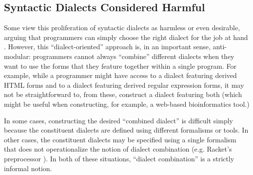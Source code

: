 \subsection{Syntactic Dialects Considered Harmful}
Some  view this proliferation of syntactic dialects as harmless or even desirable, arguing that programmers can simply choose the right dialect for the job at hand \cite{journals/stp/Ward94}. However, this ``dialect-oriented'' approach is, in an important sense, anti-modular: programmers cannot always ``combine'' different dialects when they want to use the forms that they feature together within a single program. For example, while a programmer might have access to a dialect featuring derived HTML forms and to a dialect featuring derived regular expression forms, it may not be straightforward to, from these, construct a dialect featuring both (which might be useful when constructing, for example, a web-based bioinformatics tool.) 

In some cases, constructing the desired ``combined dialect'' is difficult simply because the constituent dialects are defined using different formalisms or tools. In other cases, the constituent dialects may be specified using a single formalism that does not operationalize the notion of dialect combination (e.g. Racket's preprocessor \cite{Flatt:2012:CLR:2063176.2063195}). In both of these situations, ``dialect combination'' is a strictly informal notion. 

